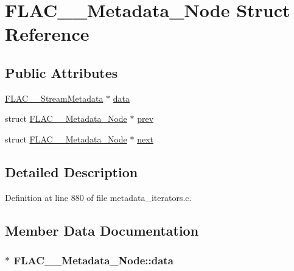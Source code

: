 \hypertarget{struct_f_l_a_c_____metadata___node}{}\section{F\+L\+A\+C\+\_\+\+\_\+\+Metadata\+\_\+\+Node Struct Reference}
\label{struct_f_l_a_c_____metadata___node}
\subsection*{Public Attributes}
\begin{DoxyCompactItemize}
\item 
\hyperlink{struct_f_l_a_c_____stream_metadata}{F\+L\+A\+C\+\_\+\+\_\+\+Stream\+Metadata} $\ast$ \hyperlink{struct_f_l_a_c_____metadata___node_ac9b7e5748f0b2a88dab586a576fd0210}{data}
\item 
struct \hyperlink{struct_f_l_a_c_____metadata___node}{F\+L\+A\+C\+\_\+\+\_\+\+Metadata\+\_\+\+Node} $\ast$ \hyperlink{struct_f_l_a_c_____metadata___node_a8fa7a6b6b6a04905e9dc135f43630341}{prev}
\item 
struct \hyperlink{struct_f_l_a_c_____metadata___node}{F\+L\+A\+C\+\_\+\+\_\+\+Metadata\+\_\+\+Node} $\ast$ \hyperlink{struct_f_l_a_c_____metadata___node_a1bc6351579714b005c2f1ac1e0805b93}{next}
\end{DoxyCompactItemize}


\subsection{Detailed Description}


Definition at line 880 of file metadata\+\_\+iterators.\+c.



\subsection{Member Data Documentation}
\subsubsection[{\texorpdfstring{data}{data}}]{$\ast$ F\+L\+A\+C\+\_\+\+\_\+\+Metadata\+\_\+\+Node\+::data}\hypertarget{struct_f_l_a_c_____metadata___node_ac9b7e5748f0b2a88dab586a576fd0210}{}\label{struct_f_l_a_c_____metadata___node_ac9b7e5748f0b2a88dab586a576fd0210}


